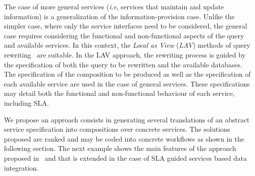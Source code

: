 The case of more general services (\textit{i.e}, services that maintain and update information) is a generalization of the information-provision case.
Unlike the simpler case, where only the service interfaces need to be considered, the general case requires considering the functional and non-functional aspects of the query and available services.
In this context, the \textit{Local as View} (\textit{LAV}) methods of query rewriting~\cite{Levy2000} are suitable.
In the LAV approach, the rewriting process is guided by the specification of both the query to be rewritten and the available databases.
The specification of the composition to be produced as well as the specification of each available service are used in the case of general services.
These specifications may detail both the functional and non-functional behaviour of each service, including SLA.


We propose an approach consists in generating several translations of an abstract service specification into compositions
over concrete  services. 
The solutions proposed are ranked and may be coded into concrete workflows as shown in the following section.  The next example shows the main features of the approach proposed in~\cite{CostaAMR13} and that is extended in the case of SLA guided services based data integration. 



